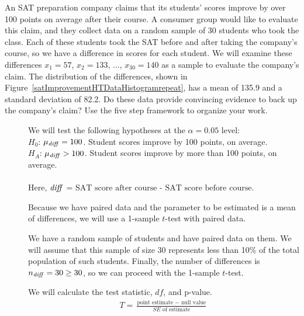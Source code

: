 \begin{examplewrap}
\begin{nexample}
{An SAT preparation company claims that its students' scores improve by over 100 points on average after their course. A consumer group would like to evaluate this claim, and they collect data on a random sample of 30 students who took the class. Each of these students took the SAT before and after taking the company's course, so we have a difference in scores for each student. We will examine these differences $x_1=57$, $x_2=133$, ..., $x_{30}=140$ as a sample to evaluate the company's claim. The distribution of the differences, shown in Figure~\ref{satImprovementHTDataHistogramrepeat}, has a mean of 135.9 and a standard deviation of 82.2. Do these data provide convincing evidence to back up the company's claim?  Use the five step framework to organize your work.  
}
\begin{description}
\item[] We will test the following hypotheses at the $\alpha=0.05$ level:\\
$H_0$: $\mu_{\text{\emph{diff}}} = 100$. Student scores improve by 100 points, on average.   \\
$H_A$: $\mu_{\text{\emph{diff}}} > 100$. Student scores improve by more than 100 points, on average.
\\
\\
Here,  ${\text{\emph{diff}}}$ = ${\text{SAT score after course - SAT score before course}}$.

\item[] Because we have paired data and the parameter to be estimated is a mean of differences, we will use a 1-sample $t$-test with paired data.

\item[] We have a random sample of students and have paired data on them.  We will assume that this sample of size 30 represents less than 10\% of the total population of such students.  Finally, the number of differences is $n_{\text{\emph{diff}}}=30\ge 30$, so we can proceed with the 1-sample $t$-test.  
 
\item[]  We will calculate the test statistic, $df$, and p-value.
\begin{align*}
T = \frac{\text{point estimate } - \text{ null value}}{SE \text{ of estimate}}
\end{align*}


\end{description}
\end{nexample}
\end{examplewrap}
